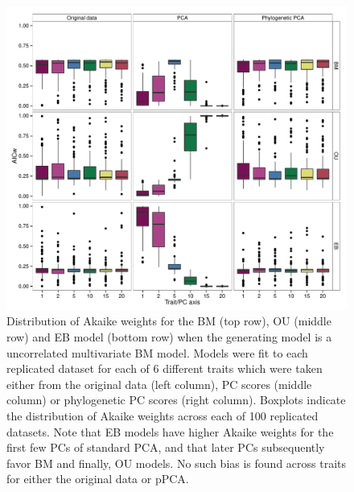 \documentclass[a4paper,12pt]{article}
\begin{document}
\begin{figure}[p]
\centering
\includegraphics[scale=0.65]{./fig/box-aicw-mvbm.pdf}
\caption{Distribution of Akaike weights for the BM (top row), OU (middle row) and EB model (bottom row) when the generating model is a uncorrelated multivariate BM model. Models were fit to each replicated dataset for each of 6 different traits which were taken either from the original data (left column), PC scores (middle column) or phylogenetic PC scores (right column). Boxplots indicate the distribution of Akaike weights across each of 100 replicated datasets. Note that EB models have higher Akaike weights for the first few PCs of standard PCA, and that later PCs subsequently favor BM and finally, OU models. No such bias is found across traits for either the original data or pPCA.}
\label{aicwbm}
\end{figure}
\end{document}
